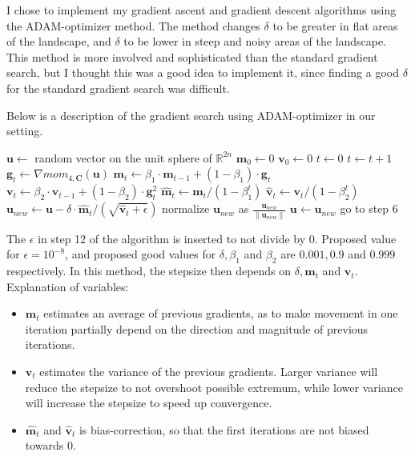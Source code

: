 \documentclass[12 pt]{article}        	%
\newcommand{\mat}[1]{\mathbf{#1}}
\renewcommand{\vec}[1]{\mathbf{#1}}
\newcommand{\bb}[1]{\mathbb{#1}}
\begin{document}
I chose to implement my gradient ascent and gradient descent algorithms using the ADAM-optimizer method. 
The method changes $\delta$ to be greater in flat areas of the landscape, and $\delta$ to be lower in steep and noisy areas of the landscape.
This method is more involved and sophisticated than the standard gradient search, but I thought this was a good idea to implement it, since finding a good $\delta$ for the standard gradient search was difficult. 

Below is a description of the gradient search using ADAM-optimizer in our setting.

\begin{algorithm}[H]
    \caption{$\mathsf{gradient \ descent \ ADAM}$}
\begin{algorithmic}[1]
    \Require{signatures $\vec{c} = \mat{C} \vec{x}$}
    \State $\vec{u} \gets $ random vector on the unit sphere of $\bb{R}^{2n}$
    \State $\vec{m}_0 \gets 0$ 
    \State $\vec{v}_0 \gets 0$ 
    \State $t \gets 0$ 
    \Loop
    \State $t \gets t + 1$
    \State $\vec{g}_t \gets \nabla mom_{4, \mat{C}}(\vec{u})$
    \State $\vec{m}_t \gets \beta_1 \cdot \vec{m}_{t-1} + (1 - \beta_1) \cdot \vec{g}_t$
    \State $\vec{v}_t \gets \beta_2 \cdot \vec{v}_{t-1} + (1 - \beta_2) \cdot \vec{g}_t^2$
    \State $\hat{\vec{m}}_t \gets \vec{m}_t / (1 - \beta_1 ^t) $
    \State $\hat{\vec{v}}_t \gets \vec{v}_t / (1 - \beta_2 ^t) $
    \State $\vec{u}_{new} \gets \vec{u} - \delta \cdot \hat{\vec{m}}_t / (\sqrt{\hat{\vec{v}}_t + \epsilon})$ 
    \State normalize $\vec{u}_{new}$ as $\frac{\vec{u}_{new}}{\lVert \vec{u}_{new} \rVert}$
    \If{$mom_{4, \mat{C}}(\vec{u}_{new}) \geq mom_{4, \mat{C}}(\vec{u})$} 
    \State \Return{$\vec{u}$}
    \Else 
    \State $\vec{u} \gets \vec{u}_{new}$
    \State go to step 6
    \EndIf
    \EndLoop
\end{algorithmic}
\end{algorithm}
The $\epsilon$ in step 12 of the algorithm is inserted to not divide by 0. Proposed value for $\epsilon = 10^{-8}$,
and proposed good values for $\delta, \beta_1$ and $\beta_2$ are $0.001, 0.9$ and $0.999$ respectively.
In this method, the stepsize then depends on $\delta, \vec{m}_t$ and $\vec{v}_t$.
Explanation of variables:
\begin{itemize}
    \item $\vec{m}_t$ estimates an average of previous gradients, as to make movement in one iteration partially depend on the direction and magnitude of previous iterations.
    \item $\vec{v}_t$ estimates the variance of the previous gradients. Larger variance will reduce the stepsize to not overshoot possible extremum, while lower variance will increase the stepsize to speed up convergence.
    \item $\hat{\vec{m}}_t$ and $\hat{\vec{v}}_t$ is bias-correction, so that the first iterations are not biased towards 0.
\end{itemize}
\end{document}
